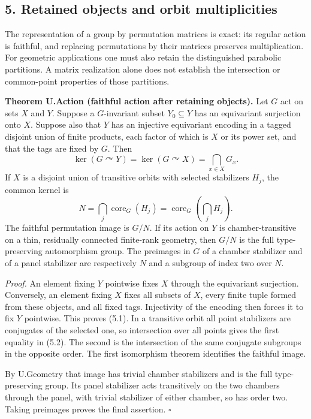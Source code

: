 \documentclass[
  11pt,
  a4paper,
]{article}
\begin{document}
\subsection{5. Retained objects and orbit
multiplicities}\label{retained-objects-and-orbit-multiplicities}

The representation of a group by permutation matrices is exact: its
regular action is faithful, and replacing permutations by their matrices
preserves multiplication. For geometric applications one must also
retain the distinguished parabolic partitions. A matrix realization
alone does not establish the intersection or common-point properties of
those partitions.

\textbf{Theorem U.Action (faithful action after retaining objects).} Let
\(G\) act on sets \(X\) and \(Y\). Suppose a \(G\)-invariant subset
\(Y_0\subseteq Y\) has an equivariant surjection onto \(X\). Suppose
also that \(Y\) has an injective equivariant encoding in a tagged
disjoint union of finite products, each factor of which is \(X\) or its
power set, and that the tags are fixed by \(G\). Then \[
\ker(G\curvearrowright Y)=\ker(G\curvearrowright X)
=\bigcap_{x\in X}G_x.
\tag{5.1}
\] If \(X\) is a disjoint union of transitive orbits with selected
stabilizers \(H_j\), the common kernel is \[
N=\bigcap_j\operatorname{core}_G(H_j)
=\operatorname{core}_G\left(\bigcap_jH_j\right).
\tag{5.2}
\] The faithful permutation image is \(G/N\). If its action on \(Y\) is
chamber-transitive on a thin, residually connected finite-rank geometry,
then \(G/N\) is the full type-preserving automorphism group. The
preimages in \(G\) of a chamber stabilizer and of a panel stabilizer are
respectively \(N\) and a subgroup of index two over \(N\).

\emph{Proof.} An element fixing \(Y\) pointwise fixes \(X\) through the
equivariant surjection. Conversely, an element fixing \(X\) fixes all
subsets of \(X\), every finite tuple formed from these objects, and all
fixed tags. Injectivity of the encoding then forces it to fix \(Y\)
pointwise. This proves (5.1). In a transitive orbit all point
stabilizers are conjugates of the selected one, so intersection over all
points gives the first equality in (5.2). The second is the intersection
of the same conjugate subgroups in the opposite order. The first
isomorphism theorem identifies the faithful image.

By U.Geometry that image has trivial chamber stabilizers and is the full
type-preserving group. Its panel stabilizer acts transitively on the two
chambers through the panel, with trivial stabilizer of either chamber,
so has order two. Taking preimages proves the final assertion.
\(\square\)
\end{document}
